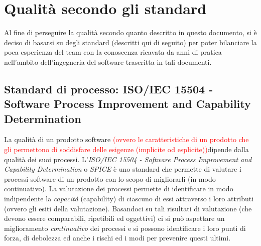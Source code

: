 \section{Qualità secondo gli standard}
Al fine di perseguire la qualità secondo quanto descritto in questo documento, si è deciso di basarsi su degli standard (descritti qui di seguito) per poter bilanciare la poca esperienza del team con la conoscenza ricavata da anni di pratica nell'ambito dell'ingegneria del software trascritta in tali documenti.
\subsection{Standard di processo: ISO/IEC 15504 - Software Process Improvement and Capability Determination}
\label{AppA:standardProc}
La qualità di un prodotto software   \textcolor{red}{(ovvero le caratteristiche di un prodotto che gli permettono di soddisfare delle esigenze (implicite od esplicite))}dipende dalla qualità dei suoi processi.
L'\emph{ISO/IEC 15504 - Software Process Improvement and Capability Determination} o \emph{SPICE} è uno standard che permette di valutare i processi software di un prodotto con lo scopo di migliorarli  (in modo continuativo). La valutazione dei processi permette di identificare in modo indipendente la \emph{capacità} (capability) di ciascuno di essi attraverso i loro attributi (ovvero gli esiti della valutazione). Basandoci su tali risultati di valutazione (che devono essere comparabili, ripetibili ed oggettivi) ci si può aspettare un miglioramento \emph{continuativo} dei processi e si possono identificare i loro punti di forza, di debolezza ed anche i rischi ed i modi per prevenire questi ultimi.

